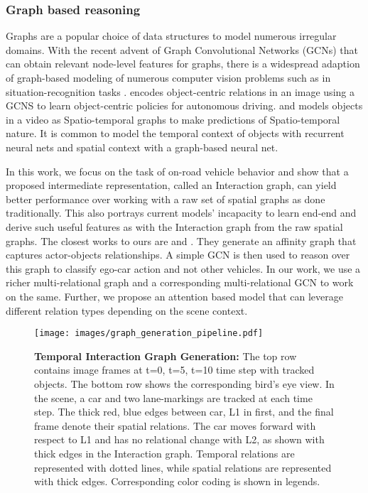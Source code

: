 \documentclass[letterpaper, 10 pt, conference]{ieeeconf}
\begin{document}
\subsubsection{Graph based reasoning}
Graphs are a popular choice of data structures to model numerous irregular domains. With the recent advent of Graph Convolutional Networks (GCNs) \cite{kipf2016semi} that can obtain relevant node-level features for graphs, there is a widespread adaption of graph-based modeling of numerous computer vision problems such as in situation-recognition tasks \cite{lisituation}.  \cite{wang2019deep} encodes object-centric relations in an image using a GCNS to learn object-centric policies for autonomous driving. \cite{jain2016structural} and \cite{mylavarapu2020accurate} models objects in a video as Spatio-temporal graphs to make predictions of Spatio-temporal nature. It is common to model the temporal context of objects with recurrent neural nets and spatial context with a graph-based neural net. 

In this work, we focus on the task of on-road vehicle behavior and show that a proposed intermediate representation, called an Interaction graph, can yield better performance over working with a raw set of spatial graphs as done traditionally. This also portrays current models' incapacity to learn end-end and derive such useful features as with the Interaction graph from the raw spatial graphs. The closest works to ours are \cite{wu2019learning} and \cite{li2019learning}. They generate an affinity graph that captures actor-objects relationships. A simple GCN is then used to reason over this graph to classify ego-car action and not other vehicles. In our work, we use a richer multi-relational graph and a corresponding multi-relational GCN to work on the same. Further, we propose an attention based model that can leverage different relation types depending on the scene context.
\begin{figure*}
    \centering
\texttt{[image: images/graph\_generation\_pipeline.pdf]}
    \caption{\scriptsize \textbf{
Temporal Interaction Graph Generation:} {The top row contains image frames at t=0, t=5, t=10 time step with tracked objects. The bottom row shows the corresponding bird's eye view. In the scene, a car and two lane-markings are tracked at each time step. The thick red, blue edges between car, L1 in first, and the final frame denote their spatial relations. The car moves forward with respect to L1 and has no relational change with L2, as shown with thick edges in the Interaction graph. Temporal relations are represented with dotted lines, while spatial relations are represented with thick edges. Corresponding color coding is shown in legends.}}
    \label{fig:graph_pipeline}
\end{figure*}
\end{document}

